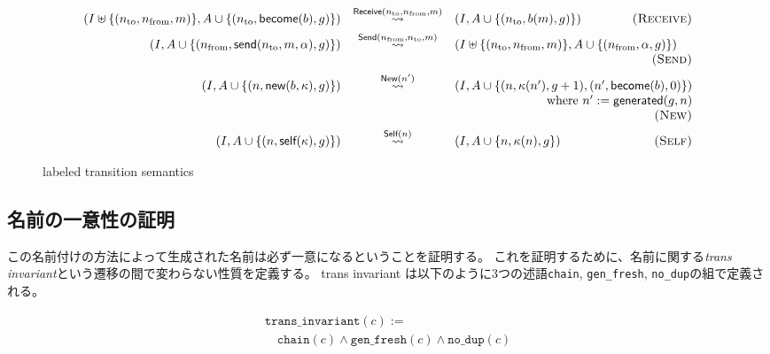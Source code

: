 \begin{figure}[t]
  \begin{displaymath}
    \begin{array}{rcl}
      (I \uplus \{(n_{\textrm{to}}, n_{\textrm{from}}, m)\}, A \cup \{(n_{\textrm{to}}, \textsf{become}(b), g)\}) &
      \overset{\textsf{Receive}(n_{\textrm{to}}, n_{\textrm{from}}, m)}{\leadsto} &
      (I, A \cup \{(n_{\textrm{to}}, b(m), g)\})
      \hfill \textsc{(Receive)} \\[1ex]

      (I, A \cup \{(n_{\textrm{from}}, \textsf{send}(n_{\textrm{to}}, m, \alpha), g)\}) &
      \overset{\textsf{Send}(n_{\textrm{from}}, n_{\textrm{to}}, m)}{\leadsto} &
      (I \uplus \{(n_{\textrm{to}}, n_{\textrm{from}}, m)\}, A \cup \{(n_{\textrm{from}}, \alpha, g)\}) \\
      & & \hfill \textsc{(Send)} \\[1ex]

      (I, A \cup \{(n, \textsf{new}(b, \kappa), g)\}) &
      \overset{\textsf{New}(n')}{\leadsto} &
      (I, A \cup \{(n, \kappa(n'), g + 1), (n', \textsf{become}(b), 0)\}) \\
      & & \hfill \textrm{where}\ n' := \textsf{generated}(g, n) \\
      & & \hfill \textsc{(New)} \\[1ex]

      (I, A \cup \{(n, \textsf{self}(\kappa), g)\}) &
      \overset{\textsf{Self}(n)}{\leadsto} &
      (I, A \cup \{n, \kappa(n), g\})
      \hfill \textsc{(Self)}
    \end{array}
  \end{displaymath}
  \caption{labeled transition semantics}\label{expr:formalization:semantics}
\end{figure}



\subsection{名前の一意性の証明}

この名前付けの方法によって生成された名前は必ず一意になるということを証明する。
これを証明するために、名前に関する\textit{trans invariant}という遷移の間で変わらない性質を定義する。
trans invariant は以下のように3つの述語\texttt{chain}, \texttt{gen\_fresh}, \texttt{no\_dup}の組で定義される。

\begin{displaymath}
  \begin{array}{l}
    \texttt{trans\_invariant}(c) := \\
    \quad \texttt{chain}(c) \wedge \texttt{gen\_fresh}(c) \wedge \texttt{no\_dup}(c)
  \end{array}
\end{displaymath}

